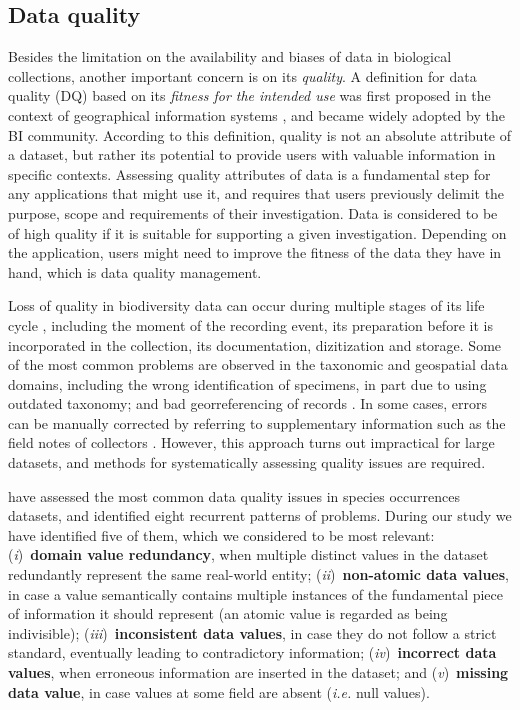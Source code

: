 







\subsection{Data quality}
Besides the limitation on the availability and biases of data in biological collections, another important concern is on its \textit{quality}.
A definition for data quality (DQ) based on its \textit{fitness for the intended use} was first proposed in the context of geographical information systems \cite{Chrisman1984}, and became widely adopted by the BI community.
According to this definition, quality is not an absolute attribute of a dataset, but rather its potential to provide users with valuable information in specific contexts.
Assessing quality attributes of data is a fundamental step for any applications that might use it, and requires that users previously delimit the purpose, scope and requirements of their investigation.
Data is considered to be of high quality if it is suitable for supporting a given investigation.
Depending on the application, users might need to improve the fitness of the data they have in hand, which is data quality management.

Loss of quality in biodiversity data can occur during multiple stages of its life cycle \cite{Chapman2005}, including the moment of the recording event, its preparation before it is incorporated in the collection, its documentation, dizitization and storage.
Some of the most common problems are observed in the taxonomic and geospatial data domains, including the wrong identification of specimens, in part due to using outdated taxonomy; and bad georreferencing of records \cite{Soberon2004}.
In some cases, errors can be manually corrected by referring to supplementary information such as the field notes of collectors \cite{Graham2004}.
However, this approach turns out impractical for large datasets, and methods for systematically assessing quality issues are required.


 have assessed the most common data quality issues in species occurrences datasets, and identified eight recurrent patterns of problems. %
During our study we have identified five of them, which we considered to be most relevant:
(\textit{i})~\textbf{domain value redundancy}, when multiple distinct values in the dataset redundantly represent the same real-world entity;
(\textit{ii})~\textbf{non-atomic data values}, in case a value semantically contains multiple instances of the fundamental piece of information it should represent (an atomic value is regarded as being indivisible);
(\textit{iii})~\textbf{inconsistent data values}, in case they do not follow a strict standard, eventually leading to contradictory information;
(\textit{iv})~\textbf{incorrect data values}, when erroneous information are inserted in the dataset; and
(\textit{v})~\textbf{missing data value}, in case values at some field are absent (\textit{i.e.} null values).

